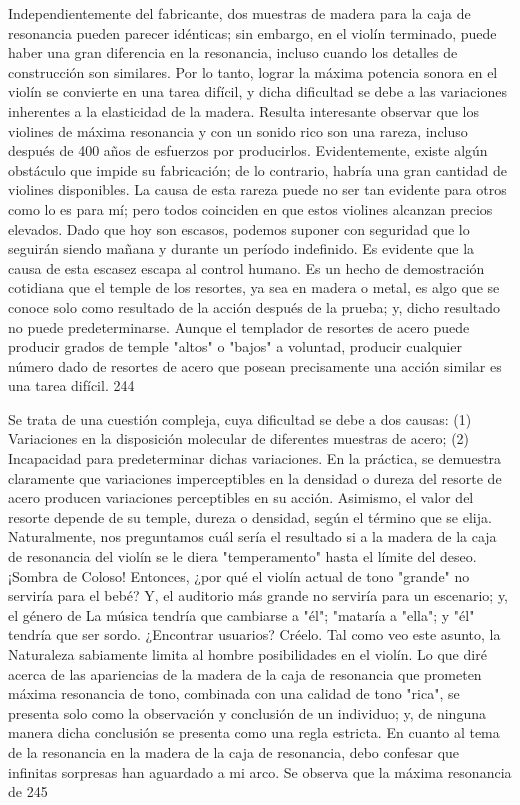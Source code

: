 Independientemente del fabricante, dos muestras de madera para la caja de resonancia pueden parecer idénticas; sin embargo, en el violín terminado, puede haber una gran diferencia en la resonancia, incluso cuando los detalles de construcción son similares. Por lo tanto, lograr la máxima potencia sonora en el violín se convierte en una tarea difícil, y dicha dificultad se debe a las variaciones inherentes a la elasticidad de la madera.
Resulta interesante observar que los violines de máxima resonancia y con un sonido rico son una rareza, incluso después de 400 años de esfuerzos por producirlos. Evidentemente, existe algún obstáculo que impide su fabricación; de lo contrario, habría una gran cantidad de violines disponibles. La causa de esta rareza puede no ser tan evidente para otros como lo es para mí; pero todos coinciden en que estos violines alcanzan precios elevados. Dado que hoy son escasos, podemos suponer con seguridad que lo seguirán siendo mañana y durante un período indefinido. Es evidente que la causa de esta escasez escapa al control humano.
Es un hecho de demostración cotidiana que el temple de los resortes, ya sea en madera o metal, es algo que se conoce solo como resultado de la acción después de la prueba; y, dicho resultado no puede predeterminarse. Aunque el templador de resortes de acero puede producir grados de temple "altos" o "bajos" a voluntad, producir cualquier número dado de resortes de acero que posean precisamente una acción similar es una tarea difícil.
244

Se trata de una cuestión compleja, cuya dificultad se debe a dos causas: (1) Variaciones en la disposición molecular de diferentes muestras de acero; (2) Incapacidad para predeterminar dichas variaciones. En la práctica, se demuestra claramente que variaciones imperceptibles en la densidad o dureza del resorte de acero producen variaciones perceptibles en su acción. Asimismo, el valor del resorte depende de su temple, dureza o densidad, según el término que se elija.
Naturalmente, nos preguntamos cuál sería el resultado si a la madera de la caja de resonancia del violín se le diera "temperamento" hasta el límite del deseo. ¡Sombra de Coloso! Entonces, ¿por qué el violín actual de tono "grande" no serviría para el bebé? Y, el auditorio más grande no serviría para un escenario; y, el género de
La música tendría que cambiarse a "él"; "mataría a "ella"; y "él" tendría que ser sordo. ¿Encontrar usuarios?
Créelo. Tal como veo este asunto, la Naturaleza sabiamente limita al hombre
posibilidades en el violín.
Lo que diré acerca de las apariencias de la madera de la caja de resonancia que prometen máxima resonancia de tono, combinada con una calidad de tono "rica", se presenta solo como la observación y conclusión de un individuo; y, de ninguna manera dicha conclusión se presenta como una regla estricta. En cuanto al tema de la resonancia en la madera de la caja de resonancia, debo confesar que infinitas sorpresas han aguardado a mi arco. Se observa que la máxima resonancia de
245

